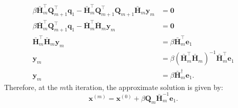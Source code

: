 \documentclass{article}
\begin{document}
\begin{align*}
    \beta \bar{\symbf{H}}_m^\top \symbf{Q}_{m+1}^\top \symbf{q}_1 - \bar{\symbf{H}}_m^\top \symbf{Q}_{m+1}^\top \symbf{Q}_{m+1} \bar{\symbf{H}}_m \symbf{y}_m & = \symbf{0}                                                                                             \\
    \beta \bar{\symbf{H}}_m^\top \symbf{Q}_{m+1}^\top \symbf{q}_1 - \bar{\symbf{H}}_m^\top \bar{\symbf{H}}_m \symbf{y}_m                                      & = \symbf{0}                                                                                             \\
    \bar{\symbf{H}}_m^\top \bar{\symbf{H}}_m \symbf{y}_m                                                                                                      & = \beta \bar{\symbf{H}}_m^\top \symbf{e}_1                                                              \\
    \symbf{y}_m                                                                                                                                               & = \beta \left( \bar{\symbf{H}}_m^\top \bar{\symbf{H}}_m \right)^{-1} \bar{\symbf{H}}_m^\top \symbf{e}_1 \\
    \symbf{y}_m                                                                                                                                               & = \beta \bar{\symbf{H}}_m^\dagger \symbf{e}_1.
\end{align*}
Therefore, at the \(m\)th iteration, the approximate solution is given by:
\begin{equation*}
    \symbf{x}^{\left( m \right)} = \symbf{x}^{\left( 0 \right)} + \beta \symbf{Q}_m \bar{\symbf{H}}_m^{-1} \symbf{e}_1.
\end{equation*}
\end{document}
